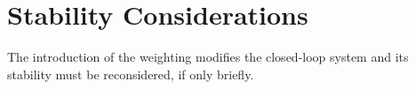 %
%
%
%

\section{Stability Considerations}
\label{sec:robust-stability}

The introduction of the weighting modifies the closed-loop system and its
stability must be reconsidered, if only briefly.

